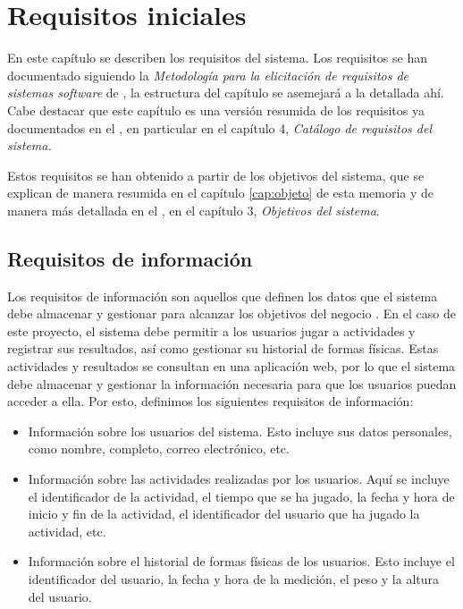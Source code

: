 \chapter{Requisitos iniciales}
\label{cap:requisitos}
En este capítulo se describen los requisitos del sistema. Los requisitos se han
documentado siguiendo la \textit{Metodología para la elicitación de requisitos
de sistemas software} de \textcite{DuranBernardez}, la estructura del capítulo
se asemejará a la detallada ahí. Cabe destacar que este capítulo es una versión
resumida de los requisitos ya documentados en el \primerAnexo, en particular en
el capítulo 4, \textit{Catálogo de requisitos del sistema.}

Estos requisitos se han obtenido a partir de los objetivos del sistema, que se
explican de manera resumida en el capítulo \ref{cap:objeto} de esta memoria y de
manera más detallada en el \primerAnexo, en el capítulo 3, \textit{Objetivos del
sistema}.

\section{Requisitos de información}
\label{c06:sec:requisitos-informacion}
Los requisitos de información son aquellos que definen los datos que el sistema
debe almacenar y gestionar para alcanzar los objetivos del negocio \parencite%
[p.~34]{DuranBernardez}. En el caso de este proyecto, el sistema debe permitir a
los usuarios jugar a actividades y registrar sus resultados, así como gestionar
su historial de formas físicas. Estas actividades y resultados se consultan en
una aplicación web, por lo que el sistema debe almacenar y gestionar la
información necesaria para que los usuarios puedan acceder a ella.  Por esto,
definimos los siguientes requisitos de información:

\begin{itemize}
    \item Información sobre los usuarios del sistema. Esto incluye sus datos
    personales, como nombre, completo, correo electrónico, etc.

    \item Información sobre las actividades realizadas por los usuarios. Aquí se
    incluye el identificador de la actividad, el tiempo que se ha jugado, la
    fecha y hora de inicio y fin de la actividad, el identificador del usuario
    que ha jugado la actividad, etc.

    \item Información sobre el historial de formas físicas de los usuarios. Esto
    incluye el identificador del usuario, la fecha y hora de la medición, el
    peso y la altura del usuario.
\end{itemize}

